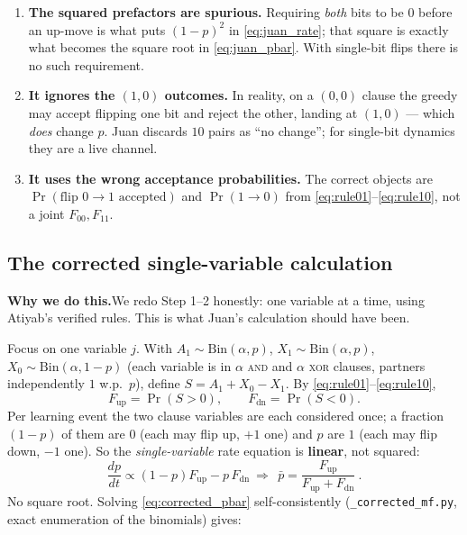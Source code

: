 \documentclass[11pt]{article}
\newcommand{\why}[1]{%
  \par\smallskip\noindent
  \colorbox{blue!8}{\parbox{\dimexpr\linewidth-2\fboxsep}{%
  \textbf{Why we do this.}\quad #1}}\par\smallskip}
\begin{document}
\begin{enumerate}[nosep]
  \item \textbf{The squared prefactors are spurious.} Requiring \emph{both} bits to be $0$ before an
        up-move is what puts $(1-p)^2$ in \eqref{eq:juan_rate}; that square is exactly what becomes
        the square root in \eqref{eq:juan_pbar}. With single-bit flips there is no such requirement.
  \item \textbf{It ignores the $(1,0)$ outcomes.} In reality, on a $(0,0)$ clause the greedy may
        accept flipping one bit and reject the other, landing at $(1,0)$ --- which \emph{does}
        change $p$. Juan discards $10$ pairs as ``no change''; for single-bit dynamics they are a
        live channel.
  \item \textbf{It uses the wrong acceptance probabilities.} The correct objects are
        $\Pr(\text{flip }0\!\to\!1\text{ accepted})$ and $\Pr(1\!\to\!0)$ from
        \eqref{eq:rule01}--\eqref{eq:rule10}, not a joint $F_{00},F_{11}$.
\end{enumerate}

\subsection{The corrected single-variable calculation}
\why{We redo Step 1--2 honestly: one variable at a time, using Atiyab's verified rules. This is
what Juan's calculation should have been.}

Focus on one variable $j$. With $A_1\sim\mathrm{Bin}(\alpha,p)$, $X_1\sim\mathrm{Bin}(\alpha,p)$,
$X_0\sim\mathrm{Bin}(\alpha,1-p)$ (each variable is in $\alpha$ \textsc{and} and $\alpha$
\textsc{xor} clauses, partners independently $1$ w.p.\ $p$), define $S=A_1+X_0-X_1$. By
\eqref{eq:rule01}--\eqref{eq:rule10},
\begin{equation}
F_{\text{up}}=\Pr(S>0),\qquad F_{\text{dn}}=\Pr(S<0).
\end{equation}
Per learning event the two clause variables are each considered once; a fraction $(1-p)$ of them
are $0$ (each may flip up, $+1$ one) and $p$ are $1$ (each may flip down, $-1$ one). So the
\emph{single-variable} rate equation is \textbf{linear}, not squared:
\begin{equation}
\frac{dp}{dt}\propto (1-p)F_{\text{up}}-p\,F_{\text{dn}}
\ \Rightarrow\
\boxed{\ \bar p=\frac{F_{\text{up}}}{F_{\text{up}}+F_{\text{dn}}}\ }.
\label{eq:corrected_pbar}
\end{equation}
No square root. Solving \eqref{eq:corrected_pbar} self-consistently (\texttt{\_corrected\_mf.py},
exact enumeration of the binomials) gives:
\end{document}
